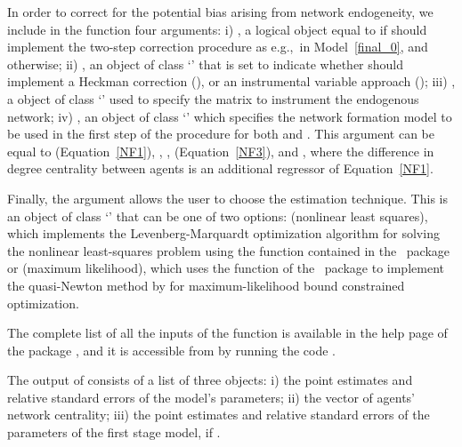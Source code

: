 \documentclass[nojss]{jss}
\begin{document}
In order to correct for the potential bias arising from network endogeneity,
we include in the function four arguments: i) , a logical
object equal to  if  should implement the two-step
correction procedure as e.g.,~in Model~\ref{final_0}, and 
otherwise; ii) , an object of class `' that
is set to indicate whether  should implement a Heckman
correction (), or an instrumental variable
approach (); iii) , a
object of class `' used to specify the matrix to instrument the
endogenous network; iv) , an object of class
`' which specifies the network formation model to be used in
the first step of the procedure for both  and
.  This argument can be equal to 
(Equation~\ref{NF1}),  \citep[Equation~\ref{NF2}, as
in][]{Fafchamps+Leij+Goyal:2010},  \citep[Equation~\ref{NF2},
as in][]{Graham:2015},  (Equation~\ref{NF3}), and ,
where the difference in degree centrality between agents is an additional
regressor of Equation~\ref{NF1}.

Finally, the argument  allows the user to choose the
estimation technique.  This is an object of class `' that can
be one of two options:  (nonlinear least squares), which
implements the Levenberg-Marquardt optimization algorithm for solving the
nonlinear least-squares problem using the function  contained in
the ~package  \citep{minpack.lm} or 
(maximum likelihood), which uses the function  of the
~package  to implement the quasi-Newton method by
\cite{bbmle} for maximum-likelihood bound constrained optimization.

The complete list of all the inputs of the function  is
available in the help page of the package , and it is accessible
from  by running the code .

The output of  consists of a list of three objects: i) the
point estimates and relative standard errors of the model's parameters; ii)
the vector of agents' network centrality; iii) the point estimates and
relative standard errors of the parameters of the first stage model, if
.
\end{document}
